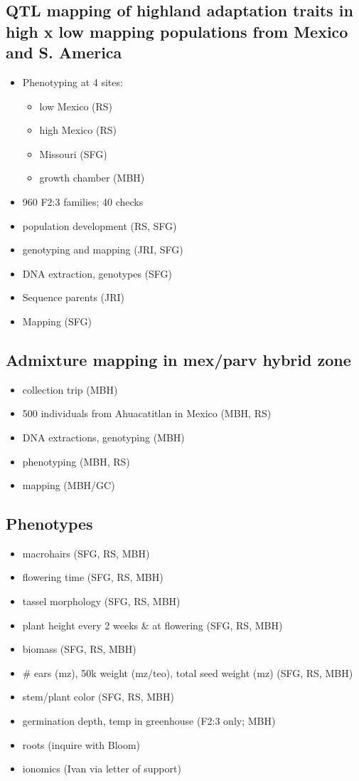 \subsection{QTL mapping of highland adaptation traits in high x low mapping populations from Mexico and S. America}
\begin{itemize}
\item Phenotyping at 4 sites: 
\begin{itemize}
\item low Mexico (RS)
\item high Mexico (RS) 
\item Missouri (SFG)
\item growth chamber (MBH)
\end{itemize}
\item 960 F2:3 families; 40 checks
\item population development (RS, SFG)
\item genotyping and mapping (JRI, SFG)
\item DNA extraction, genotypes (SFG)
\item Sequence parents (JRI)
\item Mapping (SFG)
\end{itemize}

\subsection{Admixture mapping in mex/parv hybrid zone}
\begin{itemize}
\item collection trip (MBH)
\item 500 individuals from Ahuacatitlan in Mexico (MBH, RS)
\item DNA extractions, genotyping (MBH)
\item phenotyping (MBH, RS)
\item mapping (MBH/GC)
\end{itemize}

\subsection{Phenotypes}
\begin{itemize}
\item macrohairs (SFG, RS, MBH)
\item flowering time (SFG, RS, MBH)
\item tassel morphology (SFG, RS, MBH)
\item plant height every 2 weeks \& at flowering (SFG, RS, MBH)
\item biomass (SFG, RS, MBH)
\item \# ears (mz), 50k weight (mz/teo), total seed weight (mz) (SFG, RS, MBH)
\item stem/plant color (SFG, RS, MBH)
\item germination depth, temp in greenhouse (F2:3 only; MBH)
\item roots (inquire with Bloom)
\item ionomics (Ivan via letter of support)
\end{itemize}

